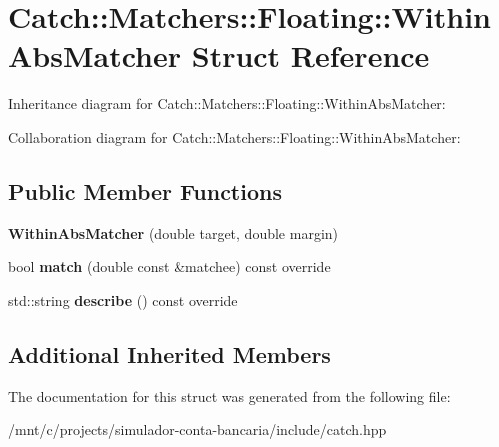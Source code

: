 \hypertarget{structCatch_1_1Matchers_1_1Floating_1_1WithinAbsMatcher}{}\section{Catch\+:\+:Matchers\+:\+:Floating\+:\+:Within\+Abs\+Matcher Struct Reference}
\label{structCatch_1_1Matchers_1_1Floating_1_1WithinAbsMatcher}


Inheritance diagram for Catch\+:\+:Matchers\+:\+:Floating\+:\+:Within\+Abs\+Matcher\+:


Collaboration diagram for Catch\+:\+:Matchers\+:\+:Floating\+:\+:Within\+Abs\+Matcher\+:
\subsection*{Public Member Functions}
\begin{DoxyCompactItemize}
\item 
\mbox{\label{structCatch_1_1Matchers_1_1Floating_1_1WithinAbsMatcher_ac45340b98c41230a7def5bd86c2d870f}} 
{\bfseries Within\+Abs\+Matcher} (double target, double margin)
\item 
\mbox{\label{structCatch_1_1Matchers_1_1Floating_1_1WithinAbsMatcher_afa5d8eed57f12c1e5d006471eb0bfe72}} 
bool {\bfseries match} (double const \&matchee) const override
\item 
\mbox{\label{structCatch_1_1Matchers_1_1Floating_1_1WithinAbsMatcher_a206a738680f8767af31d3f1835afff3f}} 
std\+::string {\bfseries describe} () const override
\end{DoxyCompactItemize}
\subsection*{Additional Inherited Members}


The documentation for this struct was generated from the following file\+:\begin{DoxyCompactItemize}
\item 
/mnt/c/projects/simulador-\/conta-\/bancaria/include/catch.\+hpp\end{DoxyCompactItemize}
